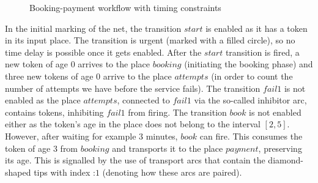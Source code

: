 \begin{figure}[!h]
\caption{Booking-payment workflow with timing constraints}
\label{fig:example}
\end{figure}

In the initial marking of the net, the transition $\mathit{start}$
is enabled as it has a token %
in its input place.
The transition is urgent (marked with a filled circle), so no time
delay is possible once it gets enabled.
After the $\mathit{start}$ transition is fired, a new token of age 
$0$ arrives to the place $\mathit{booking}$ (initiating the booking phase) 
and three new tokens of age $0$ arrive to the place $\mathit{attempts}$
(in order to count the number of attempts we have before the service fails).
The transition $\mathit{fail1}$ is not enabled as 
the place $\mathit{attempts}$, connected to $\mathit{fail1}$
via the so-called inhibitor arc, contains tokens, inhibiting
$\mathit{fail1}$ from firing. The transition $\mathit{book}$ is not enabled
either as the token's age in the place  
does not belong to the interval $[2,5]$.
However, after waiting for example $3$ minutes, $\mathit{book}$ %
can fire.  This consumes the token of age $3$ from $\mathit{booking}$ and 
transports it to the place $\mathit{payment}$, preserving its age. This
is signalled by the use of transport arcs that contain the diamond-shaped
tips with index :$1$ (denoting how these arcs are paired). 

